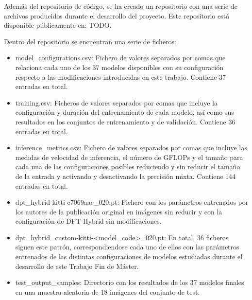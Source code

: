 
Además del repositorio de código, se ha creado un repositorio con una serie de archivos producidos durante el desarrollo del proyecto. Este repositorio está disponible públicamente en: TODO.

Dentro del repositorio se encuentran una serie de ficheros:

\begin{itemize}
\item model{\_}configurations.csv: Fichero de valores separados por comas que relaciona cada uno de los 37 modelos disponibles con su configuración respecto a las modificaciones introducidas en este trabajo. Contiene 37 entradas en total.
\item training.csv: Ficheros de valores separados por comas que incluye la configuración y duración del entrenamiento de cada modelo, así como sus resultados en los conjuntos de entrenamiento y de validación. Contiene 36 entradas en total.
\item inference{\_}metrics.csv: Fichero de valores separados por comas que incluye las medidas de velocidad de inferencia, el número de GFLOPs y el tamaño para cada una de las configuraciones posibles reduciendo y sin reducir el tamaño de la entrada y activando y desactivando la precisión mixta. Contiene 144 entradas en total.
\item dpt{\_}hybrid-kitti-e7069aae{\_}020.pt: Fichero con los parámetros entrenados por los autores de la publicación original en imágenes sin reducir y con la configuración de DPT-Hybrid sin modificaciones.
\item dpt{\_}hybrid{\_}custom-kitti-<model{\_}code>{\_}020.pt: En total, 36 ficheros siguen este patrón, correspondiendose cada uno de ellos con las parámetros entrenados de las distintas configuraciones de modelos estudiadas durante el desarrollo de este Trabajo Fin de Máster.
\item test{\_}output{\_}samples: Directorio con los resultados de los 37 modelos finales en una muestra aleatoria de 18 imágenes del conjunto de test.
\end{itemize}